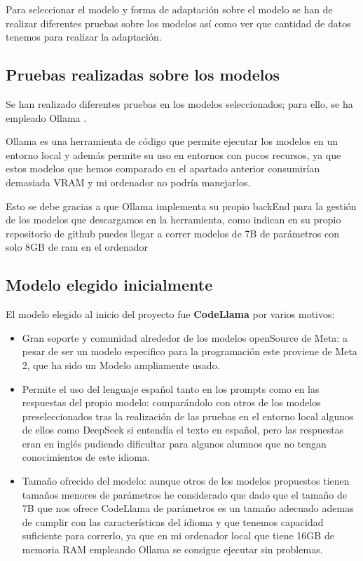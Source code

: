 
Para seleccionar el modelo y forma de adaptación sobre el modelo se han de realizar diferentes pruebas sobre los modelos así como ver que cantidad de datos tenemos para realizar la adaptación.

\subsection{Pruebas realizadas sobre los modelos}
Se han realizado diferentes  pruebas en los modelos seleccionados; para ello, se ha empleado Ollama \cite{Ollama}.

Ollama es una herramienta de código que permite ejecutar los modelos en un entorno local y además permite su uso en entornos con pocos recursos, ya que estos modelos que hemos comparado en el apartado anterior consumirían demasiada VRAM y mi ordenador no podría manejarlos.

Esto se debe gracias a que Ollama implementa su propio backEnd para la gestión de los modelos que descargamos en la herramienta, como indican en su propio repositorio de github puedes llegar a correr modelos de 7B de parámetros con solo 8GB de ram en el ordenador \cite{GithubOllama} \cite{InformacionOllama}


\subsection{Modelo elegido inicialmente}

El modelo elegido al inicio del proyecto fue \textbf{CodeLlama} por varios motivos:

\begin{itemize}
    \item Gran soporte y comunidad alrededor de los modelos openSource de Meta: a pesar de ser un modelo especifico para la programación este proviene de Meta 2, que ha sido un Modelo ampliamente usado.
    \item Permite el uso del lenguaje español tanto en los prompts como en las respuestas del propio modelo: comparándolo con otros de los modelos preseleccionados tras la realización de las pruebas en el entorno local algunos de ellos como DeepSeek si entendía el texto en español, pero las respuestas eran en inglés pudiendo dificultar para algunos alumnos que no tengan conocimientos de este idioma.
    \item Tamaño ofrecido del modelo: aunque otros de los modelos propuestos tienen tamaños menores de parámetros he considerado que dado que el tamaño de 7B que nos ofrece CodeLlama de parámetros es un tamaño adecuado ademas de cumplir con las características del idioma y que tenemos capacidad suficiente para correrlo, ya que en mi ordenador local que tiene 16GB de memoria RAM empleando Ollama se consigue ejecutar sin problemas.
\end{itemize}

